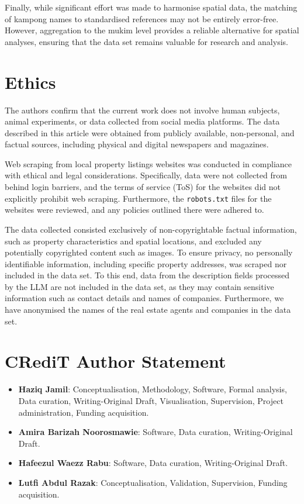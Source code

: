 \documentclass[
  number]{elsarticle}
\providecommand{\tightlist}{%
  \setlength{\itemsep}{0pt}\setlength{\parskip}{0pt}}\usepackage{longtable,booktabs,array}
\begin{document}
Finally, while significant effort was made to harmonise spatial data,
the matching of kampong names to standardised references may not be
entirely error-free. However, aggregation to the mukim level provides a
reliable alternative for spatial analyses, ensuring that the data set
remains valuable for research and analysis.

\section{Ethics}\label{ethics}

The authors confirm that the current work does not involve human
subjects, animal experiments, or data collected from social media
platforms. The data described in this article were obtained from
publicly available, non-personal, and factual sources, including
physical and digital newspapers and magazines.

Web scraping from local property listings websites was conducted in
compliance with ethical and legal considerations. Specifically, data
were not collected from behind login barriers, and the terms of service
(ToS) for the websites did not explicitly prohibit web scraping.
Furthermore, the \texttt{robots.txt} files for the websites were
reviewed, and any policies outlined there were adhered to.

The data collected consisted exclusively of non-copyrightable factual
information, such as property characteristics and spatial locations, and
excluded any potentially copyrighted content such as images. To ensure
privacy, no personally identifiable information, including specific
property addresses, was scraped nor included in the data set. To this
end, data from the description fields processed by the LLM are not
included in the data set, as they may contain sensitive information such
as contact details and names of companies. Furthermore, we have
anonymised the names of the real estate agents and companies in the data
set.

\section{CRediT Author Statement}\label{credit-author-statement}

\begin{itemize}
\tightlist
\item
  \textbf{Haziq Jamil}: Conceptualisation, Methodology, Software, Formal
  analysis, Data curation, Writing-Original Draft, Visualisation,
  Supervision, Project administration, Funding acquisition.
\item
  \textbf{Amira Barizah Noorosmawie}: Software, Data curation,
  Writing-Original Draft.
\item
  \textbf{Hafeezul Waezz Rabu}: Software, Data curation,
  Writing-Original Draft.
\item
  \textbf{Lutfi Abdul Razak}: Conceptualisation, Validation,
  Supervision, Funding acquisition.
\end{itemize}
\end{document}
